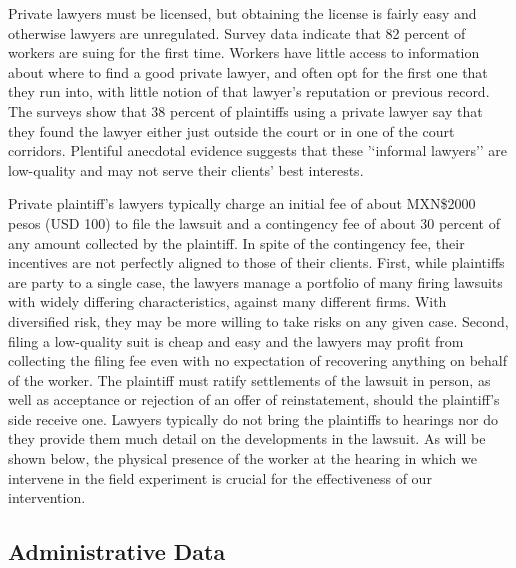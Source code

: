 Private lawyers must be licensed, but obtaining the license is fairly easy and otherwise lawyers are unregulated. Survey data indicate that 82 percent of workers are suing for the first time. Workers have little access to information about where to find a good private lawyer, and often opt for the first one that they run into, with little notion of that lawyer's reputation or previous record. The surveys show that 38 percent of plaintiffs using a private lawyer say that they found the lawyer either just outside the court or in one of the court corridors. Plentiful anecdotal evidence suggests that these '`informal lawyers'' are low-quality and may not serve their clients' best interests. 

Private plaintiff's lawyers typically charge an initial fee of about MXN\$2000 pesos (USD 100) to file the lawsuit and a contingency fee of about 30 percent of any amount collected by the plaintiff. In spite of the contingency fee, their incentives are not perfectly aligned to those of their clients. First, while plaintiffs are party to a single case, the lawyers manage a portfolio of many firing lawsuits with widely differing characteristics, against many different firms. With diversified risk, they may be more willing to take risks on any given case.   Second, filing a low-quality suit is cheap and easy and the lawyers may profit from collecting the filing fee even with no expectation of recovering anything on behalf of the worker.  The plaintiff must ratify settlements of the lawsuit in person, as well as acceptance or rejection of an offer of reinstatement, should the plaintiff's side receive one. Lawyers typically do not bring the plaintiffs to hearings nor do they provide them much detail on the developments in the lawsuit. As will be shown below, the physical presence of the worker at the hearing in which we intervene in the field experiment is crucial for the effectiveness of our intervention. 

 
 \FloatBarrier
 
\subsection{Administrative Data}

